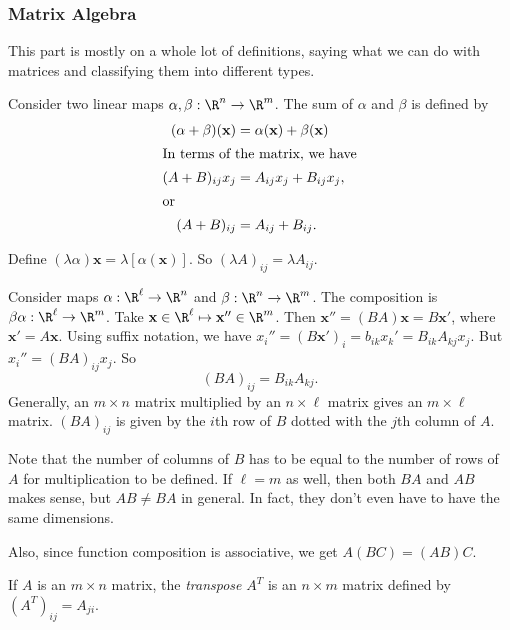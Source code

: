 \documentclass[a4paper]{article}
\begin{document}
\subsubsection{Matrix Algebra}
This part is mostly on a whole lot of definitions, saying what we can do with matrices and classifying them into different types.

\begin{defi} Consider two linear maps $\alpha, \beta: \R^n\to \R^m$. The sum of $\alpha$ and $\beta$ is defined by
  \begin{align*}
    (\alpha + \beta)(\mathbf{x}) &= \alpha(\mathbf{x}) + \beta(\mathbf{x})\\
    \intertext{In terms of the matrix, we have}
    (A + B)_{ij}x_j &= A_{ij}x_j + B_{ij}x_j,\\
    \intertext{or}
    (A + B)_{ij} &= A_{ij}+B_{ij}.
  \end{align*}
\end{defi}

\begin{defi}
  Define $(\lambda\alpha)\mathbf{x} = \lambda[\alpha(\mathbf{x})]$. So $(\lambda A)_{ij} = \lambda A_{ij}$.
\end{defi}

\begin{defi}
  Consider maps $\alpha: \R^\ell \to \R^n$ and $\beta: \R^n\to \R^m$. The composition is $\beta\alpha:\R^\ell\to\R^m$. Take $\mathbf{x}\in \R^\ell\mapsto \mathbf{x}''\in \R^m$. Then $\mathbf{x}'' = (BA)\mathbf{x} = B\mathbf{x'}$, where $\mathbf{x}' = A\mathbf{x}$. Using suffix notation, we have $x_i'' = (B\mathbf{x}')_i = b_{ik}x_k' = B_{ik}A_{kj}x_j$. But $x_i'' = (BA)_{ij}x_j$. So
  \[
    (BA)_{ij} = B_{ik}A_{kj}.
  \]
  Generally, an $m\times n$ matrix multiplied by an $n\times \ell$ matrix gives an $m\times\ell$ matrix. $(BA)_{ij}$ is given by the $i$th row of $B$ dotted with the $j$th column of $A$.
\end{defi}
Note that the number of columns of $B$ has to be equal to the number of rows of $A$ for multiplication to be defined. If $\ell = m$ as well, then both $BA$ and $AB$ makes sense, but $AB\not= BA$ in general. In fact, they don't even have to have the same dimensions.

Also, since function composition is associative, we get $A(BC) = (AB)C$.

\begin{defi}
  If $A$ is an $m\times n$ matrix, the \emph{transpose} $A^T$ is an $n\times m$ matrix defined by $(A^T)_{ij} = A_{ji}$.
\end{defi}
\end{document}
